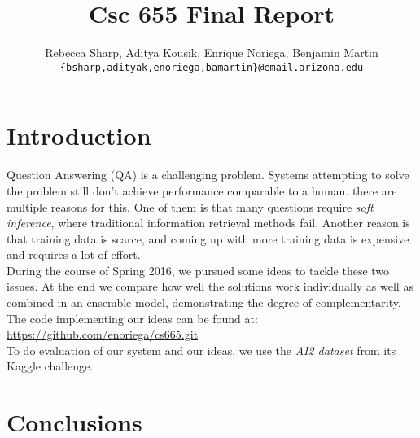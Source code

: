 \documentclass[11pt]{article}
\title{Csc 655 Final Report}
\author{Rebecca Sharp, Aditya Kousik, Enrique Noriega, Benjamin Martin\\
  {\tt \{bsharp,adityak,enoriega,bamartin\}@email.arizona.edu} \\}
\date{}
\begin{document}
\maketitle
\begin{abstract}
  
\end{abstract}

\section{Introduction}

Question Answering (QA) is a challenging problem. Systems attempting to solve the problem still don't achieve performance comparable to a human. there are multiple reasons for this. One of them is that many questions require \emph{soft inference}, where traditional information retrieval methods fail. Another reason is that training data is scarce, and coming up with more training data is expensive and requires a lot of effort. \\

During the course of Spring 2016, we pursued some ideas to tackle these two issues. At the end we compare how well the solutions work individually as well as combined in an ensemble model, demonstrating the degree of complementarity. The code implementing our ideas can be found at:\\ 
\url{https://github.com/enoriega/cs665.git}\\

To do evaluation of our system and our ideas, we use the \emph{AI2 dataset} from its Kaggle challenge.








\section{Conclusions}



\end{document}
